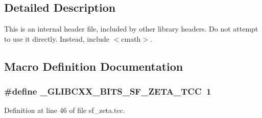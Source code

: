 \subsection{Detailed Description}
This is an internal header file, included by other library headers. Do not attempt to use it directly. Instead, include $<$cmath$>$. 

\subsection{Macro Definition Documentation}
\subsubsection[{\texorpdfstring{\+\_\+\+G\+L\+I\+B\+C\+X\+X\+\_\+\+B\+I\+T\+S\+\_\+\+S\+F\+\_\+\+Z\+E\+T\+A\+\_\+\+T\+CC}{_GLIBCXX_BITS_SF_ZETA_TCC}}]{\setlength{\rightskip}{0pt plus 5cm}\#define \+\_\+\+G\+L\+I\+B\+C\+X\+X\+\_\+\+B\+I\+T\+S\+\_\+\+S\+F\+\_\+\+Z\+E\+T\+A\+\_\+\+T\+CC~1}\hypertarget{sf__zeta_8tcc_a23ad81fae0dc2d916125d596553c5dfc}{}\label{sf__zeta_8tcc_a23ad81fae0dc2d916125d596553c5dfc}


Definition at line 46 of file sf\+\_\+zeta.\+tcc.

